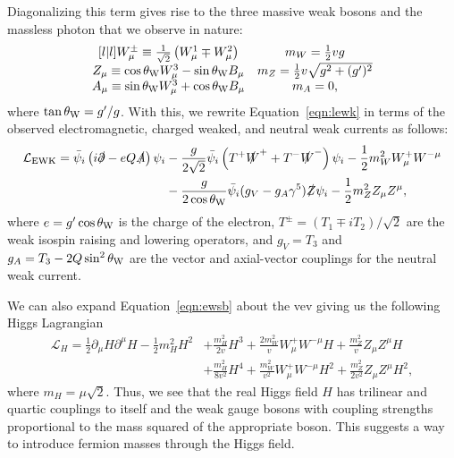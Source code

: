Diagonalizing this term gives rise to the three massive weak bosons and the massless photon that we observe in nature:
\begin{equation}
  \begin{matrix}[l | l]
    W_\mu^{\pm} \equiv \frac{1}{\sqrt{2}} \left( W_\mu^1 \mp W_\mu^2 \right)
    & m_W = \frac{1}{2} vg \\
    Z_\mu \equiv \cos \theta_{\text{W}} W_\mu^3 - \sin \theta_{\text{W}} B_\mu
    & m_Z = \frac{1}{2} v \sqrt{g^2 + (g')^2} \\
    A_\mu \equiv \sin \theta_{\text{W}} W_\mu^3 + \cos \theta_{\text{W}} B_\mu
    & m_A = 0,
  \end{matrix}
\end{equation}
where $\tan \theta_{\text{W}} = g'/g$.
With this, we rewrite Equation~\ref{eqn:lewk} in terms of the observed electromagnetic, charged weaked, and neutral weak currents as follows:
\begin{align}
  \label{eqn:lewsb}
  \mathcal{L}_{\text{EWK}} %
  = \bar \psi_i \left( i \slashed \partial - e Q \slashed A \right) \psi_i
  & - \frac{g}{2\sqrt{2}} \bar \psi_i \left( T^+ \slashed W^+ + T^- \slashed W^- \right) \psi_i - \frac{1}{2} m_W^2 W_\mu^+ W^{-\mu} \nonumber \\
   & - \frac{g}{2 \cos \thetaw} \bar \psi_i (g_V - g_A \gamma^5) \slashed Z \psi_i - \frac{1}{2} m_Z^2 Z_\mu Z^\mu, 
\end{align}
where $e = g' \cos \theta_{\text{W}}$ is the charge of the electron, $T^\pm = (T_1 \mp i T_2)/\sqrt{2}$ are the weak isospin raising and lowering operators, and $g_V = T_3$ and $g_A = T_3 - 2 Q \sin^2 \theta_{\text{W}}$ are the vector and axial-vector couplings for the neutral weak current.

We can also expand Equation~\ref{eqn:ewsb} about the vev giving us the following Higgs Lagrangian
\begin{align}
  \mathcal{L}_H = \frac{1}{2} \partial_\mu H \partial^\mu H - \frac{1}{2} m_H^2 H^2
  & + \frac{m_H^2}{2 v} H^3 + \frac{2 m_W^2}{v} W_\mu^+ W^{-\mu} H + \frac{m_Z^2}{v} Z_\mu Z^\mu H \nonumber \\
  & + \frac{m_H^2}{8 v^2} H^4 + \frac{m_W^2}{v^2} W_\mu^+ W^{-\mu} H^2 + \frac{m_Z^2}{2v^2} Z_\mu Z^\mu H^2, 
\end{align}
where $m_H = \mu \sqrt{2} $.
Thus, we see that the real Higgs field $H$ has trilinear and quartic couplings to itself and the weak gauge bosons with coupling strengths proportional to the mass squared of the appropriate boson.
This suggests a way to introduce fermion masses through the Higgs field.

